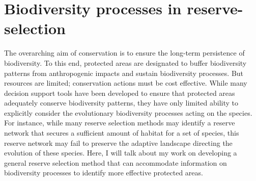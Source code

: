 \documentclass[10pt, a4paper, fleqn]{article}
\begin{document}
\section{Biodiversity processes in reserve-selection}
\begin{normalsize}
The overarching aim of conservation is to ensure the long-term persistence of biodiversity. To this end, protected areas are designated to buffer biodiversity patterns from anthropogenic impacts and sustain biodiversity processes. But resources are limited; conservation actions must be cost effective. While many decision support tools have been developed to ensure that protected areas adequately conserve biodiversity patterns, they have only limited ability to explicitly consider the evolutionary biodiversity processes acting on the species. For instance, while many reserve selection methods may identify a reserve network that secures a sufficient amount of habitat for a set of species, this reserve network may fail to preserve the adaptive landscape directing the evolution of these species. Here, I will talk about my work on developing a general reserve selection method that can accommodate information on biodiversity processes to identify more effective protected areas.
\end{normalsize}
\end{document}
